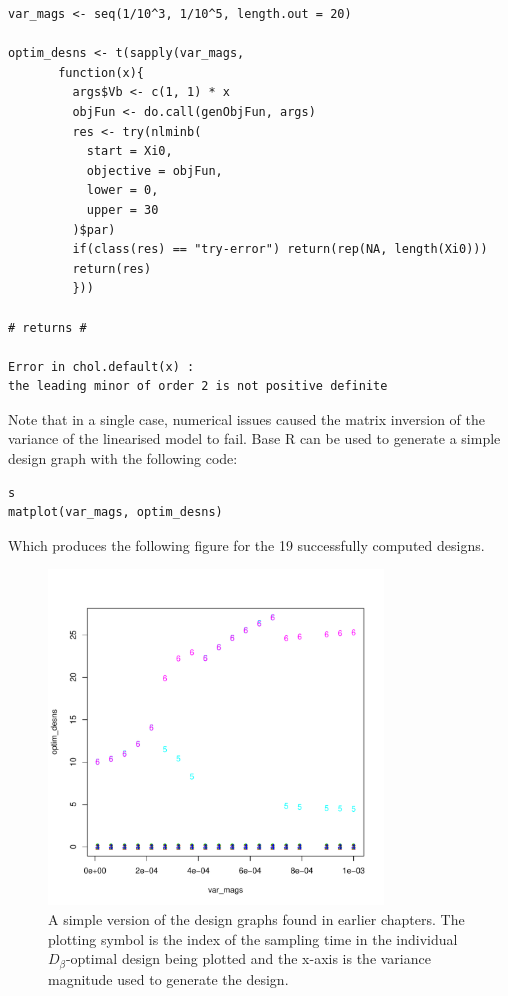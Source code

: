 \documentclass{article}
\theoremstyle{example}
\begin{document}
	\begin{verbatim}
var_mags <- seq(1/10^3, 1/10^5, length.out = 20)

optim_desns <- t(sapply(var_mags,
       function(x){
         args$Vb <- c(1, 1) * x
         objFun <- do.call(genObjFun, args)
         res <- try(nlminb(
           start = Xi0,
           objective = objFun,
           lower = 0,
           upper = 30
         )$par)
         if(class(res) == "try-error") return(rep(NA, length(Xi0)))
         return(res)
         }))

# returns #         

Error in chol.default(x) : 
the leading minor of order 2 is not positive definite

\end{verbatim}

Note that in a single case, numerical issues caused the matrix inversion of the variance of the linearised model to fail.
Base \textsf{R} can be used to generate a simple design graph with the following code:

\begin{verbatim}s
matplot(var_mags, optim_desns)
\end{verbatim}
	
Which produces the following figure for the 19 successfully computed designs.

\begin{figure}[h!]
\includegraphics[width=3.5in]{"../code/output/02 - exponential decay - desngraph"}
\caption{
	A simple version of the design graphs found in earlier chapters. 
	The plotting symbol is the index of the sampling time in the individual $D_\beta$-optimal design being plotted and the x-axis is the variance magnitude used to generate the design.
	}
\label{expdec_first_nonlin_ex}
\end{figure}
\end{document}
